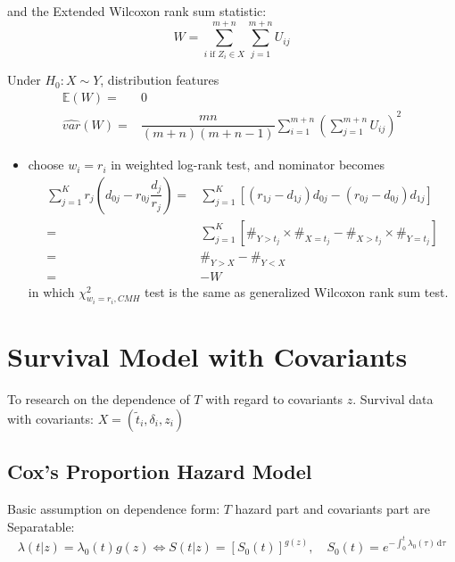 \begin{itemize}[topsep=2pt,itemsep=0pt]
    and the Extended Wilcoxon rank sum statistic:
    \begin{equation}
         W=\sum_{i\text{ if }Z_i\in X}^{m+n}\sum_{j=1}^{m+n}U_{ij}
    \end{equation}

    Under $ H_0: X\sim Y $, distribution features
    \begin{align}
        \mathbb{E}\left( W \right) =&0\\
        \hat{var}(W)=&\dfrac{mn}{(m+n)(m+n-1)}\sum_{i=1}^{m+n}\left(\sum_{j=1}^{m+n}U_{ij}\right)^2
    \end{align}

    \begin{itemize}[topsep=2pt,itemsep=0pt]
        \item choose $ w_i=r_i $ in weighted log-rank test, and nominator becomes
        \begin{align}
            \sum_{j=1}^Kr_j(d_{0j}-r_{0j}\dfrac{d_j}{r_j})=&\sum_{j=1}^K\left[ (r_{1j}-d_{1j})d_{0j}-(r_{0j}-d_{0j})d_{1j} \right]\\
            =&\sum_{j=1}^K\left[ \#_{Y>t_j}\times \#_{X=t_j}-\#_{X>t_j}\times \#_{Y=t_j}  \right]\\
            =&\#_{Y>X}-\#_{Y<X}\\
            =&-W
        \end{align}
        in which $ \chi^2_{w_i=r_i,CMH} $ test is the same as generalized Wilcoxon rank sum test.
        
        
    \end{itemize}
    
        
\end{itemize}

\section{Survival Model with Covariants} 

To research on the dependence of $ T $ with regard to covariants $ z $. Survival data with covariants: $ X=(\tilde{t}_i,\delta _i,z_i) $

\subsection{Cox's Proportion Hazard Model}
Basic assumption on dependence form: $ T $ hazard part and covariants part are Separatable:
\begin{equation}
    \lambda (t|z)=\lambda _0(t)g(z)\Leftrightarrow S(t|z)=\left[S_0(t)\right]^{g(z)},\quad S_0(t)=e^{-\int _0^t\lambda _0(\tau) \,\mathrm{d}\tau}
\end{equation}

